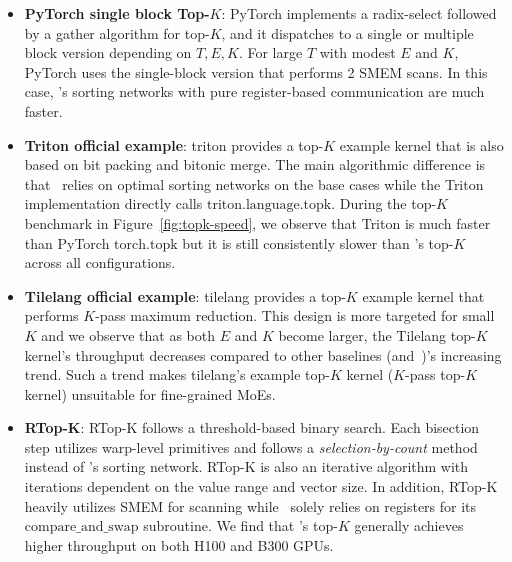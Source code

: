 \begin{itemize}
    \item \textbf{PyTorch single block Top-$K$}: PyTorch \citep{paszke2019pytorchimperativestylehighperformance} implements a radix-select followed by a gather algorithm for top-$K$, and it dispatches to a single or multiple block version depending on $T,E,K$. For large $T$ with modest $E$ and $K$, PyTorch uses the single-block version that performs 2 SMEM scans. In this case, \Algname's sorting networks with pure register-based communication are much faster.

    \item \textbf{Triton official example}: triton \citep{triton} provides a top-$K$ example kernel that is also based on bit packing and bitonic merge. The main algorithmic difference is that \Algname~relies on optimal sorting networks on the base cases while the Triton implementation directly calls $\mathrm{triton.language.topk}$. During the top-$K$ benchmark in Figure~\ref{fig:topk-speed}, we observe that Triton is much faster than PyTorch $\mathrm{torch.topk}$ but it is still consistently slower than \Algname's top-$K$ across all configurations.

    \item \textbf{Tilelang official example}: tilelang \citep{wang2025tilelang} provides a top-$K$ example kernel that performs $K$-pass maximum reduction. This design is more targeted for small $K$ and we observe that as both $E$ and $K$ become larger, the Tilelang top-$K$ kernel's throughput decreases compared to other baselines (and~\Algname)'s increasing trend. Such a trend makes tilelang's example top-$K$ kernel ($K$-pass top-$K$ kernel) unsuitable for fine-grained MoEs.

    \item \textbf{RTop-K}: RTop-K \citep{xie2025rtopk} follows a threshold-based binary search. Each bisection step utilizes warp-level primitives and follows a \textit{selection-by-count} method instead of \Algname's sorting network. RTop-K is also an iterative algorithm with iterations dependent on the value range and vector size. In addition, RTop-K heavily utilizes SMEM for scanning while \Algname~solely relies on registers for its $\mathrm{compare\_and\_swap}$ subroutine. We find that \Algname's top-$K$ generally achieves higher throughput on both H100 and B300 GPUs.
\end{itemize}
